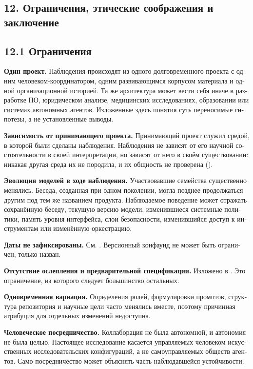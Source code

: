 \begin{russian}
\section*{12. Ограничения, этические соображения и заключение}
\label{sec:ru:12}


\subsection*{12.1 Ограничения}
\label{sec:ru:12.1}

\textbf{Один проект.} Наблюдения происходят из одного долговременного проекта с одним человеком-координатором, одним развивающимся корпусом материала и одной организационной историей. Та же архитектура может вести себя иначе в разработке ПО, юридическом анализе, медицинских исследованиях, образовании или системах автономных агентов. Изложенные здесь понятия суть переносимые гипотезы, а не установленные выводы.

\textbf{Зависимость от принимающего проекта.} Принимающий проект служил средой, в которой были сделаны наблюдения. Наблюдения не зависят от его научной состоятельности в своей интерпретации, но зависят от него в своём существовании: никакая другая среда их не породила, и их общность не проверена ().

\textbf{Эволюция моделей в ходе наблюдения.} Участвовавшие семейства существенно менялись. Беседа, созданная при одном поколении, могла позднее продолжаться другим под тем же названием продукта. Наблюдаемое поведение может отражать сохранённую беседу, текущую версию модели, изменившиеся системные политики, память уровня интерфейса, слои безопасности, изменившийся доступ к инструментам или изменённую оркестрацию.

\textbf{Даты не зафиксированы.} См. . Версионный конфаунд не может быть ограничен, только назван.

\textbf{Отсутствие ослепления и предварительной спецификации.} Изложено в . Это ограничение, из которого следует большинство остальных.

\textbf{Одновременная вариация.} Определения ролей, формулировки промптов, структура репозитория и научные цели часто менялись вместе, поэтому причинная атрибуция для отдельных изменений недоступна.

\textbf{Человеческое посредничество.} Коллаборация не была автономной, и автономия не была целью. Настоящее исследование касается управляемых человеком искусственных исследовательских конфигураций, а не самоуправляемых обществ агентов. Само посредничество может объяснять часть наблюдавшейся устойчивости.


\end{russian}
